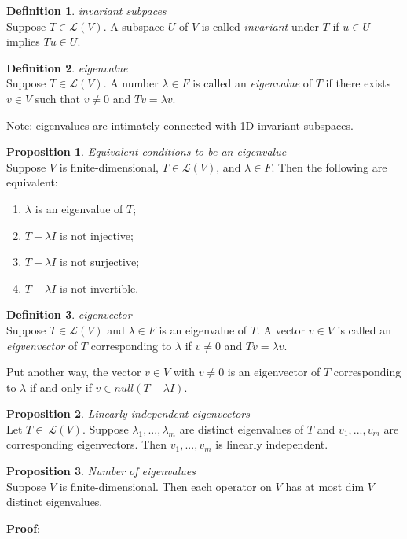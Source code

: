 \documentclass{article}
\theoremstyle{definition} %
\newtheorem{definition}{Definition}[section]
\theoremstyle{definition}
\newtheorem{proposition}{Proposition}[section]
\begin{document}
\begin{definition} \label{def:5.2}
	\textit{ invariant subpaces}\\
	Suppose $T \in \mathcal{L}(V)$.  A subspace $U$ of $V$ is called \emph{invariant} under $T$ if $u \in U$ implies $Tu \in U$.
\end{definition}

\begin{definition} \label{def:5.5}
	\textit{eigenvalue}\\
	Suppose $T \in \mathcal{L}(V)$.  A number $\lambda \in F$ is called an \emph{eigenvalue} of $T$ if there exists $v \in V$ such that $v \neq 0$ and $Tv = \lambda v$.

	Note: eigenvalues are intimately connected with 1D invariant subspaces.
\end{definition}

\begin{proposition} \label{prop:5.6}
	\textit{Equivalent conditions to be an eigenvalue}\\
	Suppose $V$ is finite-dimensional, $T \in \mathcal{L}(V)$, and $\lambda \in F$.  Then the following are equivalent:

	\begin{enumerate}
		\item $\lambda$ is an eigenvalue of $T$;

		\item $T - \lambda I$ is not injective;

		\item $T - \lambda I$ is not surjective;

		\item $T - \lambda I$ is not invertible.
	\end{enumerate}
\end{proposition}

\begin{definition} \label{def:5.7}
	\textit{eigenvector}\\
	Suppose $T \in \mathcal{L}(V)$ and $\lambda \in F$ is an eigenvalue of $T$.  A vector $v \in V$ is called an \emph{eigvenvector} of $T$ corresponding to $\lambda$ if $v \neq 0$ and $Tv 		= \lambda v$.

	Put another way, the vector $v \in V$ with $v \neq 0$ is an eigenvector of $T$ corresponding to $\lambda$ if and only if $v \in null(T - \lambda I)$.
\end{definition}

\begin{proposition} \label{prop:5.10}
	\textit{Linearly independent eigenvectors}\\
	Let $T \in\ \mathcal{L}(V)$.  Suppose $\lambda_1,..., \lambda_m$ are distinct eigenvalues of $T$ and $v_1,..., v_m$ are corresponding eigenvectors.  Then $v_1,..., v_m$ is linearly 			independent.
\end{proposition}

\begin{proposition} \label{prop:5.13}
	\textit{Number of eigenvalues}\\
	Suppose $V$ is finite-dimensional.  Then each operator on $V$ has at most dim $V$ distinct eigenvalues.
	\medskip

	\textbf{Proof}:
\end{proposition}
\end{document}
